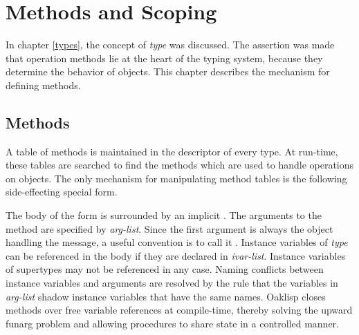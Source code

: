 %
%
%


\chapter{Methods and Scoping} \label{methods}

In chapter \ref{types}, the concept of {\it type} was discussed.
The assertion was made that operation methods lie at the heart of the
typing system, because they determine the behavior of objects.  This
chapter describes the mechanism for defining methods.

\section{Methods}

A table of methods is maintained in the descriptor of every type. At
run-time, these tables are searched to find the methods which are used
to handle operations on objects. The only mechanism for manipulating
method tables is the following side-effecting special form.


The body of the form is surrounded by an implicit .  The
arguments to the method are specified by \emph{arg-list}.  Since the
first argument is always the object handling the message, a useful
convention is to call it .  Instance variables of \emph{type}
can be referenced in the body if they are declared in \emph{ivar-list}.
Instance variables of supertypes may not be referenced in any case.
Naming conflicts between instance variables and arguments are resolved
by the rule that the variables in \emph{arg-list} shadow instance
variables that have the same names.  Oaklisp closes methods over free
variable references at compile-time, thereby solving the upward funarg
problem and allowing procedures to share state in a controlled manner.


